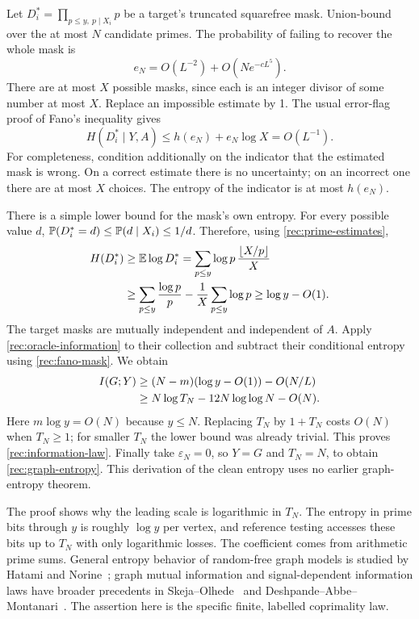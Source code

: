 Let $D_i^*=\prod_{p\le y,\ p\mid X_i}p$ be a target's truncated
squarefree mask. Union-bound over the at most $N$ candidate primes.
The probability of failing to recover the whole mask is
\begin{equation}\label{rec:mask-error}
 e_N=O(L^{-2})+O(Ne^{-cL^5}).
\end{equation}
There are at most $X$ possible masks, since each is an integer divisor
of some number at most $X$. Replace an impossible estimate by 1. The
usual error-flag proof of Fano's inequality gives
\begin{equation}\label{rec:fano-mask}
 H(D_i^*\mid Y,A)\le h(e_N)+e_N\log X=O(L^{-1}).
\end{equation}
For completeness, condition additionally on the indicator that the
estimated mask is wrong. On a correct estimate there is no uncertainty;
on an incorrect one there are at most $X$ choices. The entropy of the
indicator is at most $h(e_N)$.

There is a simple lower bound for the mask's own entropy. For every
possible value $d$, $\mathbb P(D_i^*=d)\le\mathbb P(d\mid X_i)\le1/d$.
Therefore, using \eqref{rec:prime-estimates},
\begin{align}
 H(D_i^*)&\ge\mathbb E\log D_i^*
 =\sum_{p\le y}\log p\,\frac{\lfloor X/p\rfloor}{X}\notag\\
 &\ge\sum_{p\le y}\frac{\log p}{p}
       -\frac1X\sum_{p\le y}\log p
 \ge\log y-O(1).\label{rec:mask-entropy}
\end{align}
The target masks are mutually independent and independent of $A$.
Apply \eqref{rec:oracle-information} to their collection and subtract
their conditional entropy using \eqref{rec:fano-mask}. We obtain
\begin{align}
 I(G;Y)&\ge (N-m)(\log y-O(1))-O(N/L)\notag\\
 &\ge N\log T_N-12N\log\log N-O(N).\label{rec:info-lower}
\end{align}
Here $m\log y=O(N)$ because $y\le N$. Replacing $T_N$ by $1+T_N$
costs $O(N)$ when $T_N\ge1$; for smaller $T_N$ the lower bound was
already trivial. This proves \eqref{rec:information-law}. Finally
take $\varepsilon_N=0$, so $Y=G$ and $T_N=N$, to obtain
\eqref{rec:graph-entropy}. This derivation of the clean entropy uses
no earlier graph-entropy theorem.

The proof shows why the leading scale is logarithmic in $T_N$.
The entropy in prime bits through $y$ is roughly $\log y$ per vertex,
and reference testing accesses these bits up to $T_N$ with only
logarithmic losses. The coefficient comes from arithmetic prime sums.
General entropy behavior of random-free graph models is studied by
Hatami and Norine~\cite{RecHatamiNorine2012}; graph mutual information
and signal-dependent information laws have broader precedents in
Skeja--Olhede~\cite{RecSkejaOlhede2024} and
Deshpande--Abbe--Montanari~\cite{RecDeshpandeAbbeMontanari2015}.
The assertion here is the specific finite, labelled coprimality law.


